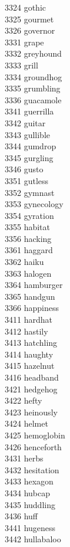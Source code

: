 3324 gothic \\
3325 gourmet \\
3326 governor \\
3331 grape \\
3332 greyhound \\
3333 grill \\
3334 groundhog \\
3335 grumbling \\
3336 guacamole \\
3341 guerrilla \\
3342 guitar \\
3343 gullible \\
3344 gumdrop \\
3345 gurgling \\
3346 gusto \\
3351 gutless \\
3352 gymnast \\
3353 gynecology \\
3354 gyration \\
3355 habitat \\
3356 hacking \\
3361 haggard \\
3362 haiku \\
3363 halogen \\
3364 hamburger \\
3365 handgun \\
3366 happiness \\
3411 hardhat \\
3412 hastily \\
3413 hatchling \\
3414 haughty \\
3415 hazelnut \\
3416 headband \\
3421 hedgehog \\
3422 hefty \\
3423 heinously \\
3424 helmet \\
3425 hemoglobin \\
3426 henceforth \\
3431 herbs \\
3432 hesitation \\
3433 hexagon \\
3434 hubcap \\
3435 huddling \\
3436 huff \\
3441 hugeness \\
3442 hullabaloo \\
